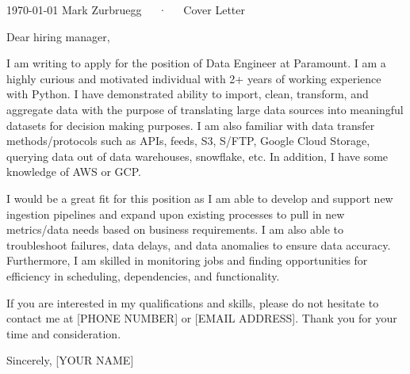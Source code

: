 \documentclass[11pt, a4paper]{awesome-cv}
\begin{document}
\makecvheader[R]

\makecvfooter
  {\today}
  {Mark Zurbruegg~~~·~~~Cover Letter}
  {}

\makelettertitle

\begin{cvletter}



Dear hiring manager,

I am writing to apply for the position of Data Engineer at Paramount. I am a highly curious and motivated individual with 2+ years of working experience with Python. I have demonstrated ability to import, clean, transform, and aggregate data with the purpose of translating large data sources into meaningful datasets for decision making purposes. I am also familiar with data transfer methods/protocols such as APIs, feeds, S3, S/FTP, Google Cloud Storage, querying data out of data warehouses, snowflake, etc. In addition, I have some knowledge of AWS or GCP.

I would be a great fit for this position as I am able to develop and support new ingestion pipelines and expand upon existing processes to pull in new metrics/data needs based on business requirements. I am also able to troubleshoot failures, data delays, and data anomalies to ensure data accuracy. Furthermore, I am skilled in monitoring jobs and finding opportunities for efficiency in scheduling, dependencies, and functionality.

If you are interested in my qualifications and skills, please do not hesitate to contact me at [PHONE NUMBER] or [EMAIL ADDRESS]. Thank you for your time and consideration.

Sincerely,
[YOUR NAME]
\end{cvletter}


\makeletterclosing
\end{document}
